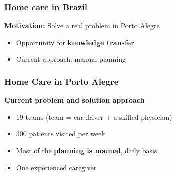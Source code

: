 \begin{frame}
   \frametitle{Home care in Brazil}

   \textbf{Motivation: } Solve a real problem in Porto Alegre

%
   \begin{itemize}

      \item Opportunity for \textbf{knowledge transfer}
      \item Current approach: manual planning
   \end{itemize}

\end{frame}

\begin{frame}
   \frametitle{Home Care in Porto Alegre}

   \textbf{Current problem and solution approach}
   \begin{itemize}
      \item 19 teams (team = car driver + a skilled physician)
      \item 300 patients visited per week
      \item Most of the \textbf{planning is manual}, daily basis
      \item One experienced caregiver
   \end{itemize}


\end{frame}


